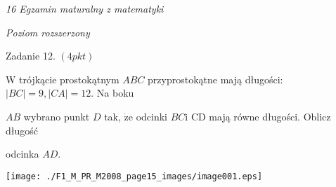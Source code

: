 \documentclass[a4paper,12pt]{article}
\begin{document}
{\it 16 Egzamin maturalny z matematyki}

{\it Poziom rozszerzony}

Zadanie 12. $(4pkt)$

$\mathrm{W}$ trójkącie prostokątnym $ABC$ przyprostokątne mają długości: $|BC|=9, |CA|=12$. Na boku

$AB$ wybrano punkt $D$ tak, $\dot{\mathrm{z}}\mathrm{e}$ odcinki $BC \mathrm{i}$ CD mają równe długości. Oblicz długość

odcinka $AD.$
\begin{center}
\texttt{[image: ./F1\_M\_PR\_M2008\_page15\_images/image001.eps]}
\end{center}
\end{document}
